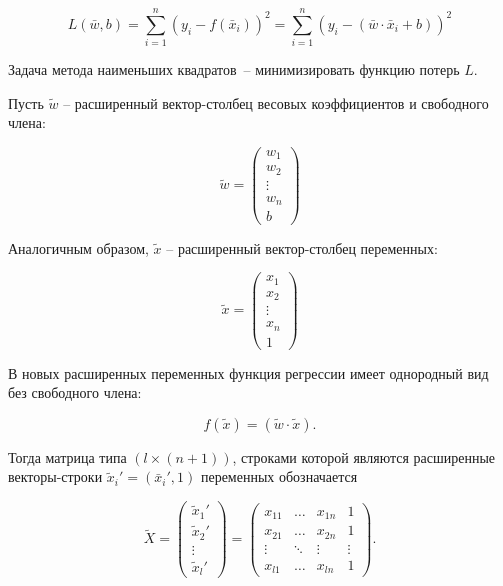 \documentclass[11pt,a4paper]{article}
\begin{document}
\begin{equation}
L(\bar{w}, b) = \sum_{i=1}^{n} (y_i - f(\bar{x}_i))^2 = \sum_{i=1}^{n} (y_i - (\bar{w} \cdot \bar{x}_i + b))^2
\end{equation}

Задача метода наименьших квадратов~-- минимизировать функцию потерь $L$.

Пусть $\tilde{w}$ -- расширенный вектор-столбец весовых коэффициентов и свободного члена:

\begin{equation}
\tilde{w} = 
\begin{pmatrix}
w_1 \\
w_2 \\
\vdots \\
w_n \\
b
\end{pmatrix}
\end{equation}

Аналогичным образом, $\tilde{x}$ -- расширенный вектор-столбец переменных:

\begin{equation}
\tilde{x} = 
\begin{pmatrix}
x_1 \\
x_2 \\
\vdots \\
x_n \\
1
\end{pmatrix}
\end{equation}

В новых расширенных переменных функция регрессии имеет однородный вид без свободного члена:

\begin{equation}
f(\tilde{x}) = (\tilde{w} \cdot \tilde{x}).
\end{equation}

Тогда матрица типа $(l \times (n + 1))$, строками которой являются расширенные векторы-строки $\tilde{x}_i' = (\bar{x}_i', 1)$ переменных обозначается

\begin{equation}
\tilde{X} = 
\begin{pmatrix}
\tilde{x}_1' \\
\tilde{x}_2' \\
\vdots \\
\tilde{x}_l'
\end{pmatrix}
=
\begin{pmatrix}
x_{11} &  \hdots & x_{1n} & 1 \\
x_{21} & \hdots & x_{2n} & 1 \\ 
\vdots & \ddots & \vdots & \vdots \\
x_{l1} & \hdots & x_{ln} & 1
\end{pmatrix}.
\end{equation}
\end{document}
